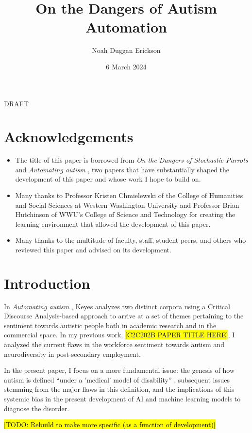 \documentclass[letterpaper]{article}
\title{On the Dangers of Autism Automation}
\author{Noah Duggan Erickson}
\date{6 March 2024}
\begin{document}
\maketitle

{\Huge \centering DRAFT}

\section*{Acknowledgements}
\begin{itemize}
    \item The title of this paper is borrowed from \textit{On the Dangers of Stochastic Parrots} \cite{stopar} and \textit{Automating autism} \cite{auto}, two papers that have substantially shaped the development of this paper and whose work I hope to build on.
    \item Many thanks to Professor Kristen Chmielewski of the College of Humanities and Social Sciences at Western Washington University and Professor Brian Hutchinson of WWU's College of Science and Technology for creating the learning environment that allowed the development of this paper.
    \item Many thanks to the multitude of faculty, staff, student peers, and others who reviewed this paper and advised on its development.
\end{itemize}
\newpage
\tableofcontents
\newpage

\section{Introduction}
In \textit{Automating autism} \cite{auto}, Keyes analyzes two distinct corpora using a Critical Discourse Analysis-based approach to arrive at a set of themes pertaining to the sentiment towards autistic people both in academic research and in the commercial space. In my previous work, \hl{[C2C202B PAPER TITLE HERE]}, I analyzed the current flaws in the workforce sentiment towards autism and neurodiversity in post-secondary employment.

In the present paper, I focus on a more fundamental issue: the genesis of how autism is defined “under a 'medical' model of disability” \cite[p.~2]{auto}, subsequent issues stemming from the major flaws in this definition, and the implications of this systemic bias in the present development of AI and machine learning models to diagnose the disorder.

\hl{[TODO: Rebuild to make more specific (as a function of development)]}
\end{document}
